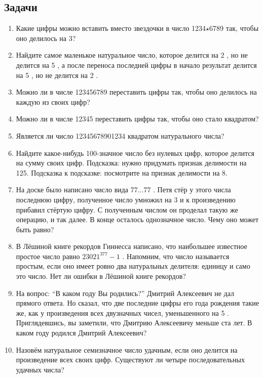 \documentclass[a4paper,12pt]{article}
\begin{document}
    \subsection*{Задачи}
    \begin{enumerate}
    \item Какие цифры можно вставить вместо звездочки в число 1234$\star$6789   так, чтобы оно делилось на 3?
    \item Найдите самое маленькое натуральное число, которое делится на 2  , но не делится на 5  , а после переноса последней цифры в начало результат делится на 5  , но не делится на 2  .
    \item Можно ли в числе 123456789   переставить цифры так, чтобы оно делилось на каждую из своих цифр?
    \item Можно ли в числе 12345   переставить цифры так, чтобы оно стало квадратом?
    \item Является ли число 12345678901234   квадратом натурального числа?
    \item Найдите какое-нибудь 100-значное число без нулевых цифр, которое делится на сумму своих цифр. Подсказка: нужно придумать признак делимости на 125. Подсказка к подсказке: посмотрите на признак делимости на 8.
    \item На доске было написано число вида 77...77  . Петя стёр у этого числа последнюю цифру, полученное число умножил на 3   и к произведению прибавил стёртую цифру. С полученным числом он проделал такую же операцию, и так далее. В конце осталось однозначное число. Чему оно может быть равно?
    \item В Лёшиной книге рекордов Гиннесса написано, что наибольшее известное простое число равно $23021^{377} - 1$  . Напомним, что число называется простым, если оно имеет ровно два натуральных делителя: единицу и само это число. Нет ли ошибки в Лёшиной книге рекордов?
    \item На вопрос: “В каком году Вы родились?” Дмитрий Алексеевич не дал прямого ответа. Но сказал, что две последние цифры его года рождения такие же, как у произведения всех двузначных чисел, уменьшенного на 5  . Приглядевшись, вы заметили, что Дмитрию Алексеевичу меньше ста лет. В каком году родился Дмитрий Алексеевич?
    \item Назовём натуральное семизначное число удачным, если оно делится на произведение всех своих цифр. Существуют ли четыре последовательных удачных числа?
    \end{enumerate}
\end{document}

